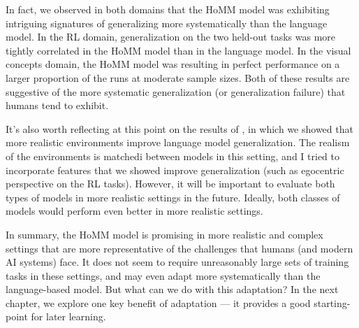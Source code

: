 In fact, we observed in both domains that the HoMM model was exhibiting intriguing signatures of generalizing more systematically than the language model. In the RL domain, generalization on the two held-out tasks was more tightly correlated in the HoMM model than in the language model. In the visual concepts domain, the HoMM model was resulting in perfect performance on a larger proportion of the runs at moderate sample sizes. Both of these results are suggestive of the more systematic generalization (or generalization failure) that humans tend to exhibit. \par

It's also worth reflecting at this point on the results of \citet{Hill2019a}, in which we showed that more realistic environments improve language model generalization. The realism of the environments is matchedi between models in this setting, and I tried to incorporate features that we showed improve generalization (such as egocentric perspective on the RL tasks). However, it will be important to evaluate both types of models in more realistic settings in the future. Ideally, both classes of models would perform even better in more realistic settings. \par

In summary, the HoMM model is promising in more realistic and complex settings that are more representative of the challenges that humans (and modern AI systems) face. It does not seem to require unreasonably large sets of training tasks in these settings, and may even adapt more systematically than the language-based model. But what can we do with this adaptation? In the next chapter, we explore one key benefit of adaptation --- it provides a good starting-point for later learning. 



